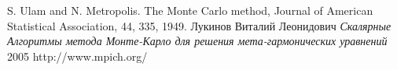 \begin{thebibliography}{00}
		S. Ulam and N. Metropolis. The Monte Carlo method, Journal of American Statistical Association, 44, 335, 1949.
	 Лукинов Виталий Леонидович \emph{Скалярные Алгоритмы метода Монте-Карло для решения мета-гармонических уравнений} 2005
	http://www.mpich.org/
\end{thebibliography}

